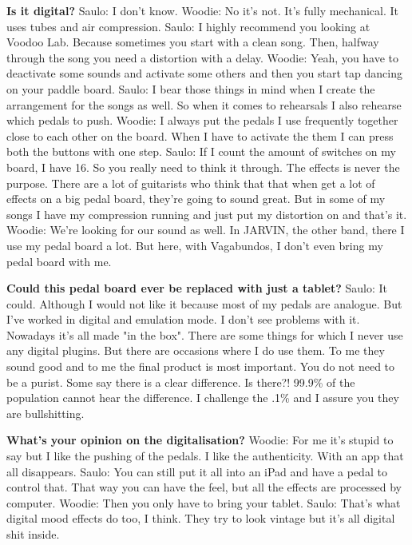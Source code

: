 \textbf{Is it digital?}
\newline Saulo: I don't know.
\newline Woodie: No it's not. It's fully mechanical. It uses tubes and air compression.
\newline Saulo: I highly recommend you looking at Voodoo Lab. Because sometimes you start with a clean song. Then, halfway through the song you need a distortion with a delay.
\newline Woodie: Yeah, you have to deactivate some sounds and activate some others and then you start tap dancing on your paddle board.
\newline Saulo: I bear those things in mind when I create the arrangement for the songs as well. So when it comes to rehearsals I also rehearse which pedals to push.
\newline Woodie: I always put the pedals I use frequently together close to each other on the board. When I have to activate the them I can press both the buttons with one step.
\newline Saulo: If I count the amount of switches on my board, I have 16. So you really need to think it through. The effects is never the purpose.
There are a lot of guitarists who think that that when get a lot of effects on a big pedal board, they're going to sound great.
But in some of my songs I have my compression running and just put my distortion on and that's it.
\newline Woodie: We're looking for our sound as well. In JARVIN, the other band, there I use my pedal board a lot. But here, with Vagabundos, I don't even bring my pedal board with me.

\textbf{Could this pedal board ever be replaced with just a tablet?}
\newline Saulo: It could. Although I would not like it because most of my pedals are analogue. But I've worked in digital and emulation mode. I don't see problems with it.
Nowadays it's all made "in the box". There are some things for which I never use any digital plugins. But there are occasions where I do use them.
To me they sound good and to me the final product is most important. You do not need to be a purist. Some say there is a clear difference. Is there?!
99.9\% of the population cannot hear the difference. I challenge the .1\% and I assure you they are bullshitting.

\textbf{What's your opinion on the digitalisation?}
\newline Woodie: For me it's stupid to say but I like the pushing of the pedals. I like the authenticity. With an app that all disappears.
\newline Saulo: You can still put it all into an iPad and have a pedal to control that. That way you can have the feel, but all the effects are processed by computer.
\newline Woodie: Then you only have to bring your tablet.
\newline Saulo: That's what digital mood effects do too, I think. They try to look vintage but it's all digital shit inside.

